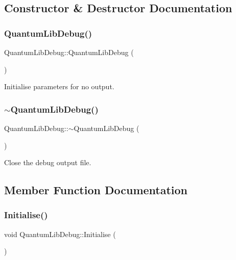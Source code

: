 \subsection{Constructor \& Destructor Documentation}
\mbox{\label{class_quantum_lib_debug_ae6b98a812d918c08cfc99a6113a3c9db}} 
\subsubsection{\texorpdfstring{Quantum\+Lib\+Debug()}{QuantumLibDebug()}}
{\footnotesize\ttfamily Quantum\+Lib\+Debug\+::\+Quantum\+Lib\+Debug (\begin{DoxyParamCaption}{ }\end{DoxyParamCaption})}

Initialise parameters for no output.~\newline
 \mbox{\label{class_quantum_lib_debug_a176c88bb82e04d8ffe9a65ab56463fd1}} 
\subsubsection{\texorpdfstring{$\sim$\+Quantum\+Lib\+Debug()}{~QuantumLibDebug()}}
{\footnotesize\ttfamily Quantum\+Lib\+Debug\+::$\sim$\+Quantum\+Lib\+Debug (\begin{DoxyParamCaption}{ }\end{DoxyParamCaption})}

Close the debug output file. 

\subsection{Member Function Documentation}
\mbox{\label{class_quantum_lib_debug_aeb109d90f04802c183d0c41037094d17}} 
\subsubsection{\texorpdfstring{Initialise()}{Initialise()}}
{\footnotesize\ttfamily void Quantum\+Lib\+Debug\+::\+Initialise (\begin{DoxyParamCaption}{ }\end{DoxyParamCaption})}

